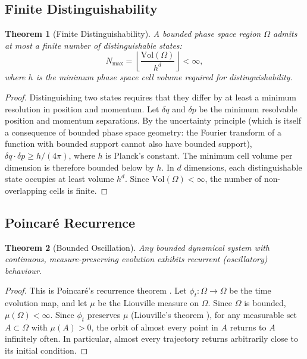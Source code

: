 \documentclass[twocolumn,10pt]{article}
\newtheorem{theorem}{Theorem}[section]
\theoremstyle{remark}
\begin{document}
\subsection{Finite Distinguishability}

\begin{theorem}[Finite Distinguishability]
\label{thm:finite_dist}
A bounded phase space region $\Omega$ admits at most a finite number of distinguishable states:
\begin{equation}
    N_{\max} = \left\lfloor \frac{\mathrm{Vol}(\Omega)}{h^d} \right\rfloor < \infty,
    \label{eq:nmax}
\end{equation}
where $h$ is the minimum phase space cell volume required for distinguishability.
\end{theorem}

\begin{proof}
Distinguishing two states requires that they differ by at least a minimum resolution in position and momentum.  Let $\delta q$ and $\delta p$ be the minimum resolvable position and momentum separations.  By the uncertainty principle (which is itself a consequence of bounded phase space geometry: the Fourier transform of a function with bounded support cannot also have bounded support), $\delta q \cdot \delta p \geq h/(4\pi)$, where $h$ is Planck's constant.  The minimum cell volume per dimension is therefore bounded below by $h$.  In $d$ dimensions, each distinguishable state occupies at least volume $h^d$.  Since $\mathrm{Vol}(\Omega) < \infty$, the number of non-overlapping cells is finite.
\end{proof}

\subsection{Poincar\'{e} Recurrence}

\begin{theorem}[Bounded Oscillation]
\label{thm:bounded_osc}
Any bounded dynamical system with continuous, measure-preserving evolution exhibits recurrent (oscillatory) behaviour.
\end{theorem}

\begin{proof}
This is Poincar\'{e}'s recurrence theorem \cite{poincare1890}.  Let $\phi_t : \Omega \to \Omega$ be the time evolution map, and let $\mu$ be the Liouville measure on $\Omega$.  Since $\Omega$ is bounded, $\mu(\Omega) < \infty$.  Since $\phi_t$ preserves $\mu$ (Liouville's theorem \cite{arnold1978,goldstein2002}), for any measurable set $A \subset \Omega$ with $\mu(A) > 0$, the orbit of almost every point in $A$ returns to $A$ infinitely often.  In particular, almost every trajectory returns arbitrarily close to its initial condition.
\end{proof}
\end{document}
